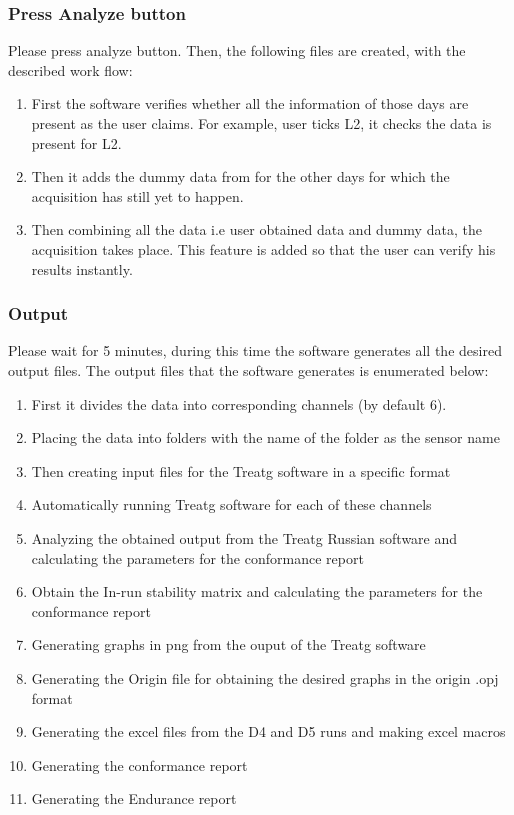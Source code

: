 \documentclass[12pt]{article}
\begin{document}
     \subsubsection{Press Analyze button}
    Please press analyze button. Then, the   following files are created, with the described work flow:
    
    \begin{enumerate}
        \item  First the software verifies whether all the information of those days are present as the user claims. For example, user ticks L2, it checks the data is present for L2.
        \item Then it adds the dummy data from   for the other days for which the acquisition has still yet to happen. 
        \item Then combining all the data i.e user obtained data and dummy data, the acquisition takes place. This feature is added so that the user can verify his results instantly.  
        
    \end{enumerate} 
    
     
    
    
    
    \subsubsection{Output}
    Please wait for 5 minutes, during this time the software generates all the desired output files. The output files that the software generates is enumerated below:
    
    \begin{enumerate}
        \item First it divides the data into corresponding channels (by default 6).
        \item Placing the data into folders with the name of the folder  as the sensor name
        \item Then creating input files for the Treatg software in a specific format
        \item Automatically running Treatg software for each of these channels 
        \item Analyzing the obtained output from the Treatg Russian software and calculating the parameters for the conformance report
        \item Obtain the In-run stability matrix and calculating the parameters for the conformance report
        \item Generating graphs in png from the ouput of the Treatg software
        \item Generating the Origin file for obtaining the desired graphs in the origin .opj format
        \item Generating the excel files from the D4 and D5 runs and making excel macros
        \item Generating the conformance report
        \item Generating the Endurance report
    \end{enumerate}
    
\end{document}
